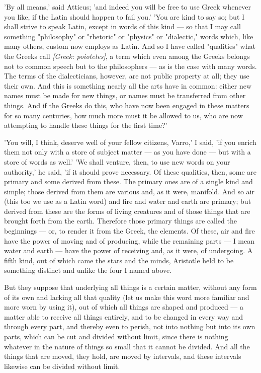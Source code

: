  'By all means,' said Atticus; 'and indeed you will be free to use Greek whenever you like, if the Latin should happen to fail you.' 'You are kind to say so; but I shall strive to speak Latin, except in words of this kind — so that I may call something "philosophy" or "rhetoric" or "physics" or "dialectic," words which, like many others, custom now employs as Latin. And so I have called "qualities" what the Greeks call \textit{[Greek: poiotetes]}, a term which even among the Greeks belongs not to common speech but to the philosophers — as is the case with many words. The terms of the dialecticians, however, are not public property at all; they use their own. And this is something nearly all the arts have in common: either new names must be made for new things, or names must be transferred from other things. And if the Greeks do this, who have now been engaged in these matters for so many centuries, how much more must it be allowed to us, who are now attempting to handle these things for the first time?'

 'You will, I think, deserve well of your fellow citizens, Varro,' I said, 'if you enrich them not only with a store of subject matter — as you have done — but with a store of words as well.' 'We shall venture, then, to use new words on your authority,' he said, 'if it should prove necessary. Of these qualities, then, some are primary and some derived from these. The primary ones are of a single kind and simple; those derived from them are various and, as it were, manifold. And so air (this too we use as a Latin word) and fire and water and earth are primary; but derived from these are the forms of living creatures and of those things that are brought forth from the earth. Therefore those primary things are called the beginnings — or, to render it from the Greek, the elements. Of these, air and fire have the power of moving and of producing, while the remaining parts — I mean water and earth — have the power of receiving and, as it were, of undergoing. A fifth kind, out of which came the stars and the minds, Aristotle held to be something distinct and unlike the four I named above.

 But they suppose that underlying all things is a certain matter, without any form of its own and lacking all that quality (let us make this word more familiar and more worn by using it), out of which all things are shaped and produced — a matter able to receive all things entirely, and to be changed in every way and through every part, and thereby even to perish, not into nothing but into its own parts, which can be cut and divided without limit, since there is nothing whatever in the nature of things so small that it cannot be divided. And all the things that are moved, they hold, are moved by intervals, and these intervals likewise can be divided without limit.

